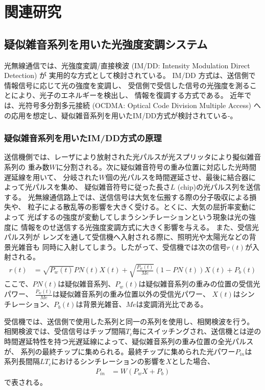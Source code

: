 ﻿\chapter{関連研究}
\section{疑似雑音系列を用いた光強度変調システム}
光無線通信では、光強度変調/直接検波 (IM/DD: Intensity Modulation Direct Detection) が
実用的な方式として検討されている。
IM/DD 方式は、送信側で情報信号に応じて光の強度を変調し、
受信側で受信した信号の光強度を測ることにより、光子のエネルギーを検出し、
情報を復調する方式である。
近年では、光符号多分割多元接続 (OCDMA: Optical Code Division Multiple Access) 
への応用を想定し、疑似雑音系列を用いたIM/DD方式が検討されている\cite{ocdma1}-\cite{csk2}。

\subsection{疑似雑音系列を用いたIM/DD方式の原理}
送信機側では、レーザにより放射された光パルスが光スプリッタにより擬似雑音系列の
重み数$W$に分割される。次に疑似雑音符号の重み位置に対応した光時間遅延線を用いて、
分岐された$W$個の光パルスを時間遅延させ、最後に結合器によって光パルスを集め、
疑似雑音符号に従った長さ$L$ (chip)の光パルス列を送信する。
光無線通信路上では、送信信号は大気を伝搬する際の分子吸収による損失や、
粒子による散乱等の影響を大きく受ける。とくに、大気の屈折率変動によって
光ぱするの強度が変動してしまうシンチレーションという現象は光の強度に
情報をのせ送信する光強度変調方式に大きく影響を与える\cite{scinti}。
また、受信光パルス列が
レンズを通して受信機へ入射される際に、照明光や太陽光などの背景光雑音も
同時に入射してしまう。したがって、受信機では次の信号$r(t)$が入射される。
\begin{align}
r(t) &= \sqrt{P_w(t)} PN(t) X(t) + \sqrt{\frac{P_w(t)}{Me}}(1-PN(t)) X(t) + P_b(t)
\end{align}
ここで、$PN(t)$は疑似雑音系列、$P_w(t)$は疑似雑音系列の重みの位置の受信光パワー、
$\frac{P_w(t)}{Me}$は疑似雑音系列の重み位置以外の受信光パワー、
$X(t)$はシンチレーション、$P_b(t)$は背景光雑音、$Me$は変調消光比である。

受信機では、送信側で使用した系列と同一の系列を使用し、相関検波を行う。
相関検波では、受信信号はチップ間隔$T_c$毎にスイッチングされ、送信機とは逆の
時間遅延特性を持つ光遅延線によって、疑似雑音系列の重み位置の全光パルスが、
系列の最終チップに集められる。最終チップに集められた光パワー$P_{in}$は
系列長間隔$LT_c$におけるシンチレーションの影響を$X$とした場合、
\begin{align}
P_{in} &= W(P_w X + P_b)
\end{align}
で表される。

